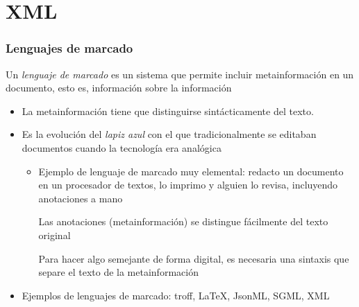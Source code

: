 \documentclass[ucs]{beamer}
\begin{document}
\section{XML}
\begin{frame}[fragile]
\frametitle{Lenguajes de marcado}
Un \emph{lenguaje de marcado} es un sistema que permite incluir metainformación en un documento, esto
es, información sobre la información

\begin{itemize}
\item
La metainformación tiene que
distinguirse sintácticamente del texto.


\item
Es la evolución del \emph{lapiz azul} con el que tradicionalmente se editaban
documentos cuando la tecnología era analógica
\begin{itemize}
\item
Ejemplo de lenguaje de marcado muy elemental: redacto un documento en un procesador de textos, 
lo imprimo y alguien lo revisa, incluyendo anotaciones a mano

Las anotaciones (metainformación) se distingue fácilmente del texto original

Para hacer algo semejante de forma digital, es necesaria una sintaxis que separe el texto
de la metainformación
\end{itemize}


\item
Ejemplos de lenguajes de marcado: troff, LaTeX, JsonML, SGML, XML


\end{itemize}

\end{frame}
\end{document}
